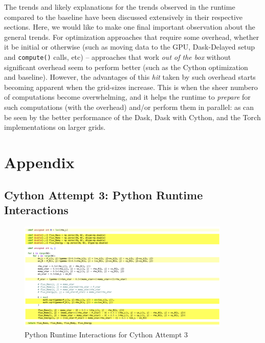 \documentclass[a4paper,10pt]{article}
\begin{document}
The trends and likely explanations for the trends observed in the runtime compared to the baseline have been discussed extensively in their respective sections. Here, we would like to make one final important observation about the general trends. For optimization approaches that require some overhead, whether it be initial or otherwise (such as moving data to the GPU, Dask-Delayed setup and \verb|compute()| calls, etc) -- approaches that work \textit{out of the box} without significant overhead seem to perform better (such as the Cython optimization and baseline). However, the advantages of this \textit{hit} taken by such overhead starts becoming apparent when the grid-sizes increase. This is when the sheer numbero of computations become overwhelming, and it helps the runtime to \textit{prepare} for such computations (with the overhead) and/or perform them in parallel: as can be seen by the better performance of the Dask, Dask with Cython, and the Torch implementations on larger grids.

\section{Appendix}

\subsection{Cython Attempt 3: Python Runtime Interactions}
\begin{figure}[H]
  \centering
  \includegraphics[width=0.9\textwidth]{images/misc/cython_attempt_3_annotated.png}
  \caption{Python Runtime Interactions for Cython Attempt 3}
  \label{fig:cython_attempt_3_annotated}
\end{figure}
\end{document}
